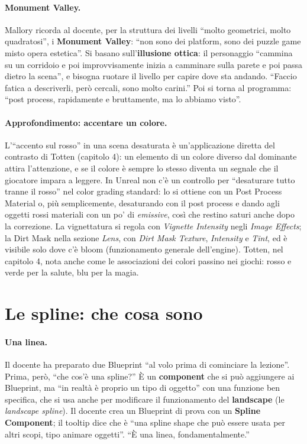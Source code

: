 \paragraph{Monument Valley.} Mallory ricorda al docente, per la struttura dei livelli ``molto
geometrici, molto quadratosi'', i \textbf{Monument Valley}: ``non sono dei platform, sono dei
puzzle game misto opera estetica''. Si basano sull'\textbf{illusione ottica}: il personaggio
``cammina su un corridoio e poi improvvisamente inizia a camminare sulla parete e poi passa
dietro la scena'', e bisogna ruotare il livello per capire dove sta andando. ``Faccio fatica a
descriverli, però cercali, sono molto carini.'' Poi si torna al programma: ``post process,
rapidamente e bruttamente, ma lo abbiamo visto''.

\paragraph{Approfondimento: accentare un colore.} L'``accento sul rosso'' in una scena
desaturata è un'applicazione diretta del contrasto di Totten (capitolo 4): un elemento di un
colore diverso dal dominante attira l'attenzione, e se il colore è sempre lo stesso diventa un
segnale che il giocatore impara a leggere. In Unreal non c'è un controllo per ``desaturare
tutto tranne il rosso'' nel color grading standard: lo si ottiene con un Post Process Material
o, più semplicemente, desaturando con il post process e dando agli oggetti rossi materiali con
un po' di \emph{emissive}, così che restino saturi anche dopo la correzione. La vignettatura si
regola con \emph{Vignette Intensity} negli \emph{Image Effects}; la Dirt Mask nella sezione
\emph{Lens}, con \emph{Dirt Mask Texture}, \emph{Intensity} e \emph{Tint}, ed è visibile solo
dove c'è bloom (funzionamento generale dell'engine). Totten, nel capitolo 4, nota anche come
le associazioni dei colori passino nei giochi: rosso e verde per la salute, blu per la magia.

\section{Le spline: che cosa sono}
\label{ue16:sec:spline}

\paragraph{Una linea.} Il docente ha preparato due Blueprint ``al volo prima di cominciare la
lezione''. Prima, però, ``che cos'è una spline?'' È un \textbf{component} che si può aggiungere
ai Blueprint, ma ``in realtà è proprio un tipo di oggetto'' con una funzione ben specifica, che
si usa anche per modificare il funzionamento del \textbf{landscape} (le \emph{landscape
spline}). Il docente crea un Blueprint di prova con un \textbf{Spline Component}; il tooltip
dice che è ``una spline shape che può essere usata per altri scopi, tipo animare oggetti''.
``È una linea, fondamentalmente.''

